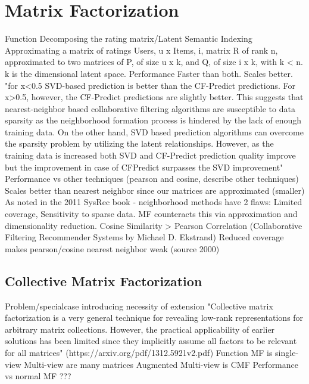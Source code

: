 \section{Matrix Factorization} \label{bg:matrixfactorization}
Function
Decomposing the rating matrix/Latent Semantic Indexing
Approximating a matrix of ratings
Users, u x Items, i, matrix R of rank n, approximated to two matrices of P, of size u x k, and Q, of size i x k, with k < n.
k is the dimensional latent space.
Performance
Faster than both. Scales better.
"for x<0.5 SVD-based prediction is
better than the CF-Predict predictions. For x>0.5,
however, the CF-Predict predictions are slightly
better. This suggests that nearest-neighbor based
collaborative filtering algorithms are susceptible to
data sparsity as the neighborhood formation process
is hindered by the lack of enough training data. On
the other hand, SVD based prediction algorithms can
overcome the sparsity problem by utilizing the latent
relationships. However, as the training data is
increased both SVD and CF-Predict prediction
quality improve but the improvement in case of CFPredict
surpasses the SVD improvement"
Performance vs other techniques (pearson and cosine, describe other techniques)
Scales better than nearest neighbor since our matrices are approximated (smaller)
As noted in the 2011 SysRec book - neighborhood methods have 2 flaws: Limited coverage, Sensitivity to sparse data. MF counteracts this via approximation and dimensionality reduction.
Cosine Similarity > Pearson Correlation (Collaborative Filtering Recommender Systems by Michael D. Ekstrand)
Reduced coverage makes pearson/cosine nearest neighbor weak (source 2000)
\subsection{Collective Matrix Factorization}
Problem/specialcase introducing necessity of extension
"Collective matrix factorization is a very general technique
for revealing low-rank representations for arbitrary
matrix collections. However, the practical applicability
of earlier solutions has been limited since
they implicitly assume all factors to be relevant for all
matrices" (https://arxiv.org/pdf/1312.5921v2.pdf)
Function
MF is single-view
Multi-view are many matrices
Augmented Multi-view is CMF
Performance vs normal MF
???